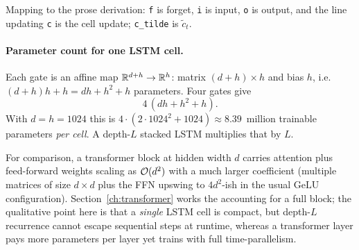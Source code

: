 \noindent
Mapping to the prose derivation: \texttt{f} is forget, \texttt{i} is input,
\texttt{o} is output, and the line updating \texttt{c} is the cell update;
\texttt{c\_tilde} is \(\tilde c_t\).

\paragraph{Parameter count for one LSTM cell.}
Each gate is an affine map \(\mathbb{R}^{d+h} \to \mathbb{R}^{h}\): matrix \((d+h)\times h\)
and bias \(h\), i.e.\ \((d+h)h + h = dh + h^{2} + h\) parameters. Four gates
give
\begin{equation}
  4\,(dh + h^{2} + h).
\end{equation}
With \(d = h = 1024\) this is \(4 \cdot (2\cdot 1024^{2} + 1024) \approx 8.39\)~million trainable parameters \emph{per cell}. A depth-\(L\) stacked LSTM
multiplies that by \(L\).

For comparison, a transformer block at hidden width \(d\) carries attention
plus feed-forward weights scaling as \(\mathcal{O}(d^{2})\) with a much larger
coefficient (multiple matrices of size \(d \times d\) plus the FFN upswing to
\(4d^{2}\)-ish in the usual \(\mathrm{GeLU}\) configuration). Section~\ref{ch:transformer}
works the accounting for a full block; the qualitative point here is that a
\emph{single} LSTM cell is compact, but depth-\(L\) recurrence cannot escape
sequential steps at runtime, whereas a transformer layer pays more parameters
per layer yet trains with full time-parallelism.
